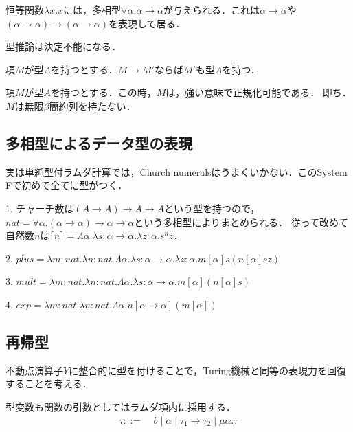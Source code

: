 \documentclass[uplatex, dvipdfmx]{jsreport}
\begin{document}
\begin{example}
    恒等関数$\lambda x.x$には，多相型$\forall\alpha.\alpha\to\alpha$が与えられる．これは$\alpha\to\alpha$や$(\alpha\to\alpha)\to(\alpha\to\alpha)$を表現して居る．
\end{example}

\begin{proposition}[型推論]
    型推論は決定不能になる．
\end{proposition}

\begin{theorem}
    項$M$が型$A$を持つとする．$M\to M'$ならば$M'$も型$A$を持つ．
\end{theorem}
\begin{theorem}
    項$M$が型$A$を持つとする．この時，$M$は，強い意味で正規化可能である．
    即ち．$M$は無限$\beta$簡約列を持たない．
\end{theorem}

\subsection{多相型によるデータ型の表現}
実は単純型付ラムダ計算では，Church numeralsはうまくいかない．このSystem Fで初めて全てに型がつく．

\begin{example}
    1. チャーチ数は$(A\to A)\to A\to A$という型を持つので，$nat = \forall\alpha.(\alpha\to\alpha)\to\alpha\to\alpha$という多相型によりまとめられる．
    従って改めて自然数$n$は$\lceil n\rceil = \Lambda\alpha.\lambda s:\alpha\to\alpha.\lambda z:\alpha.s^nz$．

    2. $plus = \lambda m:nat.\lambda n:nat.\Lambda\alpha.\lambda s:\alpha\to\alpha.\lambda z:\alpha.m[\alpha]s(n[\alpha]sz)$

    3. $mult = \lambda m:nat.\lambda n:nat.\Lambda\alpha.\lambda s:\alpha\to\alpha.m[\alpha](n[\alpha]s)$

    4. $exp = \lambda m:nat.\lambda n:nat.\Lambda\alpha.n[\alpha\to\alpha](m[\alpha])$
\end{example}

\subsection{再帰型}
不動点演算子$Y$に整合的に型を付けることで，Turing機械と同等の表現力を回復することを考える．

\begin{shadebox}\begin{definition}[再帰型]
    型変数も関数の引数としてはラムダ項内に採用する．
    \begin{align*}
        \tau ::=&\; b\mid \alpha\mid \tau_1\to\tau_2 \mid \mu\alpha.\tau
    \end{align*}
\end{definition}\end{shadebox}
\end{document}
